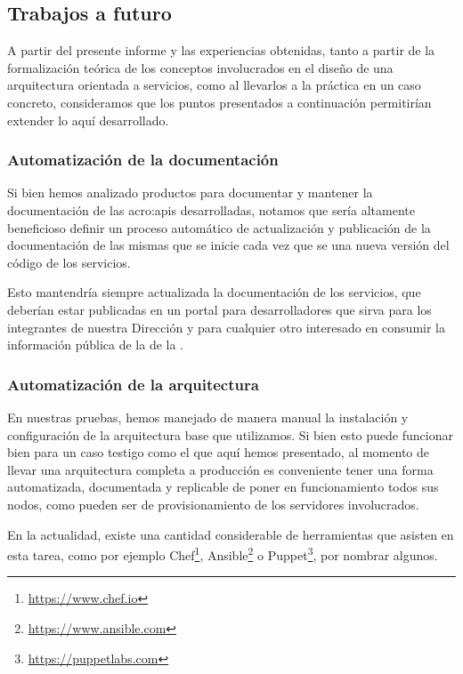 \subsection{Trabajos a futuro}
\label{trabajos-a-futuro}

A partir del presente informe y las experiencias obtenidas, tanto a partir de la formalización teórica de los conceptos involucrados en el diseño de una arquitectura orientada a servicios, como al llevarlos a la práctica en un caso concreto, consideramos que los puntos presentados a continuación permitirían extender lo aquí desarrollado.

\subsubsection{Automatización de la documentación}

Si bien hemos analizado productos para documentar y mantener la documentación de las \glspl{acro:api} desarrolladas, notamos que sería altamente beneficioso definir un proceso automático de actualización y publicación de la documentación de las mismas que se inicie cada vez que se  una nueva versión del código de los servicios.

Esto mantendría siempre actualizada la documentación de los servicios, que deberían estar publicadas en un portal para desarrolladores que sirva para los integrantes de nuestra Dirección y para cualquier otro interesado en consumir la información pública de la {\cloud} de la {\unlp}.

\subsubsection{Automatización de la arquitectura}

En nuestras pruebas, hemos manejado de manera manual la instalación y configuración de la arquitectura base que utilizamos. Si bien esto puede funcionar bien para un caso testigo como el que aquí hemos presentado, al momento de llevar una arquitectura completa a producción es conveniente tener una forma automatizada, documentada y replicable de poner en funcionamiento todos sus nodos, como pueden ser  de provisionamiento de los servidores involucrados.

En la actualidad, existe una cantidad considerable de herramientas que asisten en esta tarea, como por ejemplo Chef\footnote{\url{https://www.chef.io}}, Ansible\footnote{\url{https://www.ansible.com}} o Puppet\footnote{\url{https://puppetlabs.com}}, por nombrar algunos.

